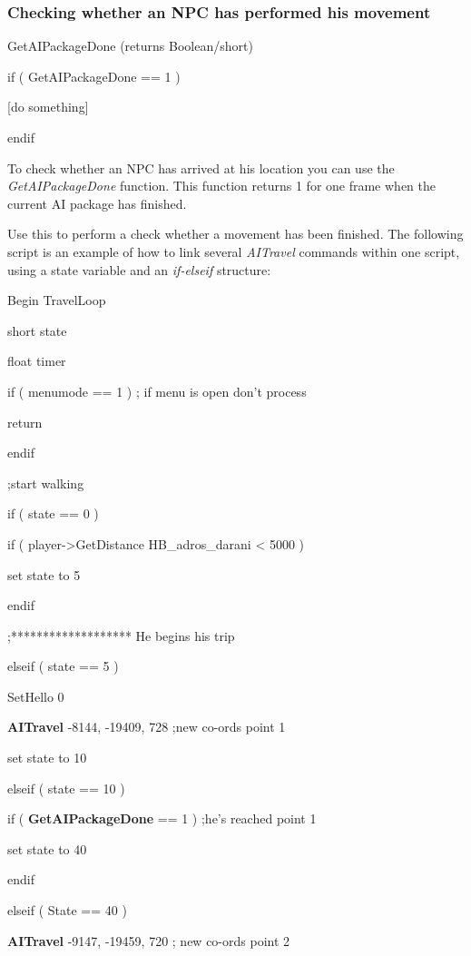 \documentclass[
]{article}
\begin{document}
\hypertarget{checking-whether-an-npc-has-performed-his-movement}{%
\subsubsection{Checking whether an NPC has performed his
movement}\label{checking-whether-an-npc-has-performed-his-movement}}

GetAIPackageDone (returns Boolean/short)

if ( GetAIPackageDone == 1 )

{[}do something{]}

endif

To check whether an NPC has arrived at his location you can use the
\emph{GetAIPackageDone} function. This function returns 1 for one frame
when the current AI package has finished.

Use this to perform a check whether a movement has been finished. The
following script is an example of how to link several \emph{AITravel}
commands within one script, using a state variable and an
\emph{if-elseif} structure:

Begin TravelLoop

short state

float timer

if ( menumode == 1 ) ; if menu is open don't process

return

endif

;start walking

if ( state == 0 )

if ( player-\textgreater GetDistance HB\_adros\_darani \textless{} 5000
)

set state to 5

endif

;******************* He begins his trip

elseif ( state == 5 )

SetHello 0

\textbf{AITravel} -8144, -19409, 728 ;new co-ords point 1

set state to 10

elseif ( state == 10 )

if ( \textbf{GetAIPackageDone} == 1 ) ;he's reached point 1

set state to 40

endif

elseif ( State == 40 )

\textbf{AITravel} -9147, -19459, 720 ; new co-ords point 2
\end{document}
